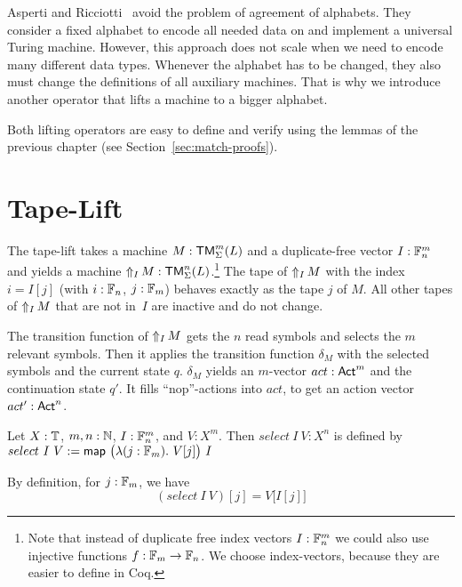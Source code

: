 Asperti and Ricciotti~\cite{asperti2015} avoid the problem of agreement of alphabets.  They consider a fixed alphabet to encode all needed data on and
implement a universal Turing machine.  However, this approach does not scale when we need to encode many different data types.  Whenever the alphabet
has to be changed, they also must change the definitions of all auxiliary machines.  That is why we introduce another operator that lifts a machine to
a bigger alphabet.

Both lifting operators are easy to define and verify using the lemmas of the previous chapter (see Section~\ref{sec:match-proofs}).


\section{Tape-Lift}
\label{sec:n-Lift}
%

The tape-lift takes a machine $M:\TM_\Sigma^m(L)$ and a duplicate-free vector $I: \Fin_n^m$ and yields a machine
$\LiftTapes{M}{I} : \TM_\Sigma^n(L)$.\footnote{ Note that instead of duplicate free index vectors $I:\Fin_n^m$ we could also use injective functions
  $f: \Fin_m \to \Fin_n$.  We choose index-vectors, because they are easier to define in Coq.}  The tape of $\LiftTapes{M}{I}$ with the index
$i = I[j]$ (with $i:\Fin_n$, $j:\Fin_m$) behaves exactly as the tape $j$ of $M$.  All other tapes of $\LiftTapes{M}{I}$ that are not in~$I$ are
inactive and do not change.


The transition function of $\LiftTapes{M}{I}$ gets the $n$ read symbols and selects the $m$ relevant symbols.  Then it applies the transition function
$\delta_M$ with the selected symbols and the current state $q$.  $\delta_M$ yields an $m$-vector $act:\Act^m$ and the continuation state $q'$.  It
fills ``nop''-actions into $act$, to get an action vector $act':\Act^n$.

\begin{definition}
  \label{def:select}
  Let $X:\Type$, $m,n:\Nat$, $I : \Fin_n^m$, and $V : X^m$.  Then $select~I~V : X^n$ is defined by
  $select~I~V := \map{\bigl(\lambda (j:\Fin_m).~V[j] \bigr)}{I}$
\end{definition}
\begin{lemma}
  By definition, for $j:\Fin_m$, we have
  \[
    (select~I~V)[j]=V\bigl[I[j]\bigr]
  \]
\end{lemma}

